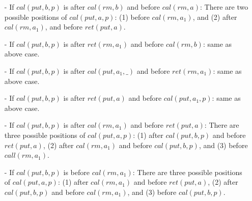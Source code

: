 \begin{itemize}
\setlength{\itemsep}{0.5pt}
\item[-] If $\textit{cal}(\textit{put},b,p)$ is after $\textit{cal}(\textit{rm},b)$ and before $\textit{cal}(\textit{rm},a)$: There are two possible positions of $\textit{cal}(\textit{put},a,p)$: (1) before $\textit{cal}(\textit{rm},a_1)$, and (2) after $\textit{cal}(\textit{rm},a_1)$, and before $\textit{ret}(\textit{put},a)$.

\item[-] If $\textit{cal}(\textit{put},b,p)$ is after $\textit{ret}(\textit{rm},a_1)$ and before $\textit{cal}(\textit{rm},b)$: same as above case.

\item[-] If $\textit{cal}(\textit{put},b,p)$ is after $\textit{cal}(\textit{put},a_1,\_)$ and before $\textit{ret}(\textit{rm},a_1)$: same as above case.

\item[-] If $\textit{cal}(\textit{put},b,p)$ is after $\textit{ret}(\textit{put},a)$ and before $\textit{cal}(\textit{put},a_1,p)$: same as above case.

\item[-] If $\textit{cal}(\textit{put},b,p)$ is after $\textit{cal}(\textit{rm},a_1)$ and before $\textit{ret}(\textit{put},a)$: There are three possible positions of $\textit{cal}(\textit{put},a,p)$: (1) after $\textit{cal}(\textit{put},b,p)$ and before $\textit{ret}(\textit{put},a)$, (2) after $\textit{cal}(\textit{rm},a_1)$ and before $\textit{cal}(\textit{put},b,p)$, and (3) before $\textit{call}(\textit{rm},a_1)$.

\item[-] If $\textit{cal}(\textit{put},b,p)$ is before $\textit{cal}(\textit{rm},a_1)$: There are three possible positions of $\textit{cal}(\textit{put},a,p)$: (1) after $\textit{cal}(\textit{rm},a_1)$ and before $\textit{ret}(\textit{put},a)$, (2) after $\textit{cal}(\textit{put},b,p)$ and before $\textit{cal}(\textit{rm},a_1)$, and (3) before $\textit{cal}(\textit{put},b,p)$.
\end{itemize}

